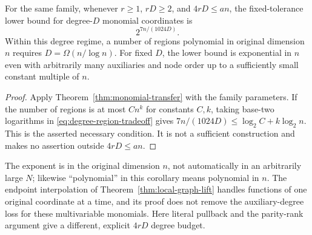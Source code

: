 \begin{corollary}\label{cor:degree-regions}
For the same family, whenever $r\ge1$, $rD\ge2$, and $4rD\le an$,
the fixed-tolerance lower bound for degree-$D$ monomial coordinates is
\begin{equation}\label{eq:degree-region-tradeoff}
 2^{7n/(1024D)}.
\end{equation}
Within this degree regime, a number of regions polynomial in original
dimension $n$ requires $D=\Omega(n/\log n)$. For fixed $D$, the lower
bound is exponential in $n$ even with arbitrarily many auxiliaries and
node order up to a sufficiently small constant multiple of $n$.
\end{corollary}
\begin{proof}
Apply Theorem~\ref{thm:monomial-transfer} with the family parameters. If
the number of regions is at most $Cn^k$ for constants $C,k$, taking
base-two logarithms in \eqref{eq:degree-region-tradeoff} gives
$7n/(1024D)\le\log_2 C+k\log_2 n$. This is the asserted necessary
condition. It is not a sufficient construction and makes no assertion
outside $4rD\le an$.
\end{proof}
The exponent is in the original dimension $n$, not automatically in an
arbitrarily large $N$; likewise ``polynomial'' in this corollary means
polynomial in $n$. The endpoint interpolation of
Theorem~\ref{thm:local-graph-lift} handles functions of one original
coordinate at a time, and its proof does not remove the auxiliary-degree
loss for these multivariable monomials. Here literal pullback and the
parity-rank argument give a different, explicit $4rD$ degree budget.
